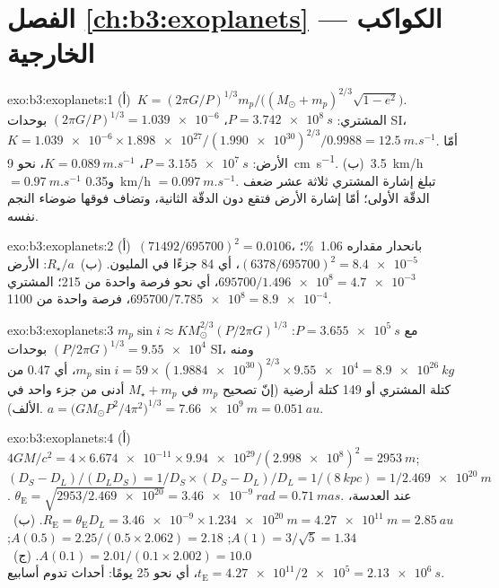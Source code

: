 \section*{الفصل \ref{ch:b3:exoplanets} --- الكواكب الخارجية}

\begin{solution}{exo:b3:exoplanets:1}
(أ)~$K = (2\pi G/P)^{1/3}m_p/\bigl((M_\odot + m_p)^{2/3}\sqrt{1 - e^2}\bigr)$.
المشتري: $P = \qty{3.742e8}{s}$، $(2\pi G/P)^{1/3} = \num{1.039e-6}$
بوحدات SI، $K = \num{1.039e-6}\times\num{1.898e27}/(\num{1.990e30})^{2/3}/0.9988
= \qty{12.5}{m.s^{-1}}$. أمّا الأرض: $P = \qty{3.155e7}{s}$، $K =
\qty{0.089}{m.s^{-1}}$، نحو \qty{9}{cm.s^{-1}}. (ب)~\qty{3.5}{km/h} $=
\qty{0.97}{m.s^{-1}}$ و\qty{0.35}{km/h} $= \qty{0.097}{m.s^{-1}}$.
تبلغ إشارة المشتري ثلاثة عشر ضعف الدقّة الأولى؛ أمّا إشارة الأرض فتقع
دون الدقّة الثانية، وتضاف فوقها ضوضاء النجم نفسه.
\end{solution}

\begin{solution}{exo:b3:exoplanets:2}
(أ)~$(71492/695700)^2 = \num{0.0106}$، بانحدار مقداره \qty{1.06}{\percent}؛
$(6378/695700)^2 = \num{8.4e-5}$، أي 84 جزءًا في المليون. (ب)~$R_\star/a$:
الأرض $695700/\num{1.496e8} = \num{4.7e-3}$، أي نحو فرصة واحدة من 215؛
المشتري $695700/\num{7.785e8} = \num{8.9e-4}$، فرصة واحدة من 1100.
\end{solution}

\begin{solution}{exo:b3:exoplanets:3}
$m_p\sin i \approx K M_\odot^{2/3}(P/2\pi G)^{1/3}$ مع $P =
\qty{3.655e5}{s}$: $(P/2\pi G)^{1/3} = \num{9.55e4}$ بوحدات SI، ومنه $m_p
\sin i = 59\times(\num{1.9884e30})^{2/3}\times\num{9.55e4} =
\qty{8.9e26}{kg}$، أي 0.47 من كتلة المشتري أو 149 كتلة أرضية
(إنّ تصحيح $m_p$ في $M_\star + m_p$ أدنى من جزء واحد في الألف).
$a = \bigl(GM_\odot P^2/4\pi^2\bigr)^{1/3} = \qty{7.66e9}{m} =
\qty{0.051}{au}$.
\end{solution}

\begin{solution}{exo:b3:exoplanets:4}
(أ)~$4GM/c^2 = 4\times\num{6.674e-11}\times\num{9.94e29}/(\num{2.998e8})^2 =
\qty{2953}{m}$; $(D_S - D_L)/(D_LD_S) = 1/D_S\times(D_S - D_L)/D_L =
1/(\qty{8}{kpc}) = 1/\qty{2.469e20}{m}$. $\theta_\mathrm E =
\sqrt{2953/\num{2.469e20}} = \qty{3.46e-9}{rad} = \qty{0.71}{mas}$. عند
العدسة، $R_\mathrm E = \theta_\mathrm E D_L = \num{3.46e-9}\times
\qty{1.234e20}{m} = \qty{4.27e11}{m} = \qty{2.85}{au}$. (ب)~$A(1) =
3/\sqrt5 = 1.34$; $A(0.5) = 2.25/(0.5\times2.062) = 2.18$; $A(0.1) =
2.01/(0.1\times2.002) = 10.0$. (ج)~$t_\mathrm E = \num{4.27e11}/\num{2e5}
= \qty{2.13e6}{s}$، أي نحو 25 يومًا: أحداث  تدوم أسابيع.
\end{solution}

